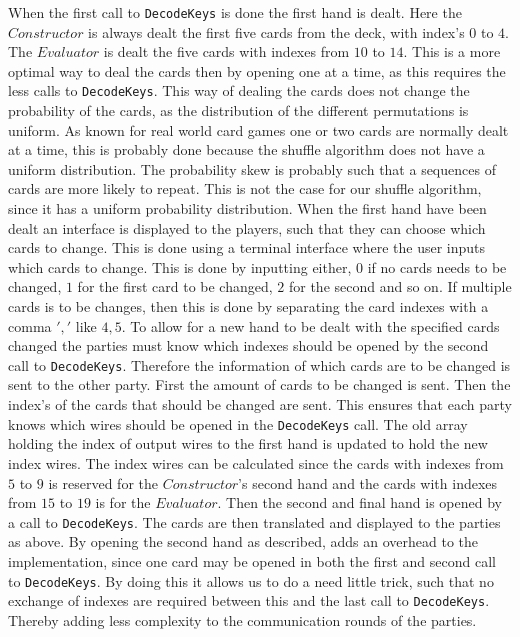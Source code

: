\documentclass[twoside,11pt,openright]{report}
\begin{document}
When the first call to \verb|DecodeKeys| is done the first hand is dealt. Here the $Constructor$ is always dealt the first five cards from the deck, with index's $0$ to $4$. The $Evaluator$ is dealt the five cards with indexes from $10$ to $14$. This is a more optimal way to deal the cards then by opening one at a time, as this requires the less calls to \verb|DecodeKeys|. This way of dealing the cards does not change the probability of the cards, as the distribution of the different permutations is uniform. As known for real world card games one or two cards are normally dealt at a time, this is probably done because the shuffle algorithm does not have a uniform distribution. The probability skew is probably such that a sequences of cards are more likely to repeat. This is not the case for our shuffle algorithm, since it has a uniform probability distribution. When the first hand have been dealt an interface is displayed to the players, such that they can choose which cards to change. This is done using a terminal interface where the user inputs which cards to change. This is done by inputting either, $0$ if no cards needs to be changed, $1$ for the first card to be changed, $2$ for the second and so on. If multiple cards is to be changes, then this is done by separating the card indexes with a comma $','$ like $4,5$. To allow for a new hand to be dealt with the specified cards changed the parties must know which indexes should be opened by the second call to \verb|DecodeKeys|. Therefore the information of which cards are to be changed is sent to the other party. First the amount of cards to be changed is sent. Then the index's of the cards that should be changed are sent. This ensures that each party knows which wires should be opened in the \verb|DecodeKeys| call. The old array holding the index of output wires to the first hand is updated to hold the new index wires. The index wires can be calculated since the cards with indexes from $5$ to $9$ is reserved for the $Constructor$'s second hand and the cards with indexes from $15$ to $19$ is for the $Evaluator$. Then the second and final hand is opened by a call to \verb|DecodeKeys|. The cards are then translated and displayed to the parties as above. By opening the second hand as described, adds an overhead to the implementation, since one card may be opened in both the first and second call to \verb|DecodeKeys|. By doing this it allows us to do a need little trick, such that no exchange of indexes are required between this and the last call to \verb|DecodeKeys|. Thereby adding less complexity to the communication rounds of the parties.
\end{document}
